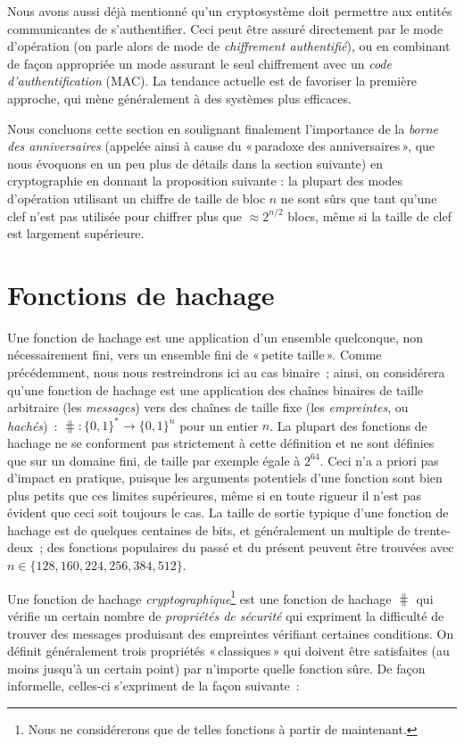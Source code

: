 Nous avons aussi déjà mentionné qu'un cryptosystème doit permettre aux entités communicantes de s'authentifier. Ceci peut être assuré directement
par le mode d'opération (on parle alors de mode de \emph{chiffrement authentifié}), ou en combinant de façon appropriée un mode assurant le seul chiffrement avec
un \emph{code d'authentification} (MAC).
La tendance actuelle est de favoriser la première approche, qui mène généralement à des systèmes plus efficaces.


Nous concluons cette section en soulignant finalement l'importance de la \emph{borne des anniversaires} (appelée ainsi à cause du «\,paradoxe des anniversaires\,»,
que nous évoquons en un peu plus de détails dans la section suivante) en cryptographie en donnant la proposition suivante : la plupart des modes d'opération
utilisant un chiffre de taille de bloc $n$ ne sont sûrs que tant qu'une clef n'est pas utilisée pour chiffrer plus que $\approx 2^{n/2}$ blocs,
même si la taille de clef est largement supérieure.




\section{Fonctions de hachage}

Une fonction de hachage est une application d'un ensemble quelconque, non nécessairement fini, vers un ensemble fini de «\,petite taille\,».
Comme précédemment, nous nous restreindrons ici au cas binaire~; ainsi, on considérera qu'une  
fonction de hachage  est une application des chaînes binaires de taille arbitraire (les \emph{messages}) vers des chaînes de taille
fixe (les \emph{empreintes}, ou \emph{hachés})~:
$\hash : \{0,1\}^* \rightarrow \{0,1\}^n$ pour un entier $n$.
La plupart des fonctions de hachage ne se conforment pas strictement à cette définition et ne sont définies que sur un domaine fini, de taille par exemple égale
à $2^{64}$. Ceci n'a a priori pas d'impact en pratique, puisque les arguments potentiels d'une fonction sont bien plus petits que ces
limites supérieures, même si en toute rigueur il n'est pas évident que ceci soit toujours le cas. 
La taille de sortie typique d'une fonction de hachage est de quelques centaines de bits, et généralement un multiple de trente-deux~; des fonctions populaires
du passé et du présent peuvent être trouvées avec 
$n \in \{128, 160, 224, 256, 384, 512\}$.

Une fonction de hachage \emph{cryptographique}\footnote{Nous ne considérerons que de telles fonctions à partir de maintenant.} est une fonction
de hachage $\hash$ qui vérifie un certain nombre de \emph{propriétés de sécurité} qui expriment la difficulté de trouver des messages
produisant des empreintes vérifiant certaines conditions. On définit généralement trois propriétés «\,classiques\,» qui doivent être satisfaites
(au moins jusqu'à un certain point) par n'importe quelle fonction sûre. De façon informelle, celles-ci s'expriment de la façon suivante~:

